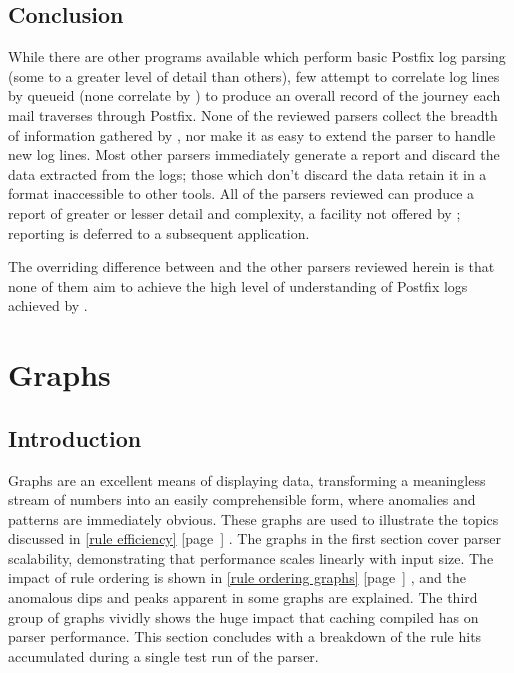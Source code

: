 \documentclass[a4paper,12pt,draft]{article}
\newcommand{\parsername}{\PLP{}}
\newcommand{\refwithpage}[1]{%
    \empty{}\ref{#1} [page~\pageref{#1}]%
}
\newcommand{\sectionref}[1]{%
    \textsection{}\refwithpage{#1}%
}
\begin{document}
\subsection{Conclusion}

While there are other programs available which perform basic Postfix log
parsing (some to a greater level of detail than others), few attempt to
correlate log lines by queueid (none correlate by \pid{}) to produce an
overall record of the journey each mail traverses through Postfix.  None of
the reviewed parsers collect the breadth of information gathered by
\parsername{}, nor make it as easy to extend the parser to handle new log
lines.  Most other parsers immediately generate a report and discard the
data extracted from the logs; those which don't discard the data retain it
in a format inaccessible to other tools.  All of the parsers reviewed can
produce a report of greater or lesser detail and complexity, a facility not
offered by \parsername{}; reporting is deferred to a subsequent
application.

The overriding difference between \parsername{} and the other parsers
reviewed herein is that none of them aim to achieve the high level of
understanding of Postfix logs achieved by \parsername{}.




\label{bibliography}

\section{Graphs}

\label{graphs}

\renewcommand{\figurename}{Graph}

\subsection{Introduction}

Graphs are an excellent means of displaying data, transforming a
meaningless stream of numbers into an easily comprehensible form, where
anomalies and patterns are immediately obvious.  These graphs are used to
illustrate the topics discussed in \sectionref{rule efficiency}.  The
graphs in the first section cover parser scalability, demonstrating that
performance scales linearly with input size.  The impact of rule ordering
is shown in \sectionref{rule ordering graphs}, and the anomalous dips and
peaks apparent in some graphs are explained.  The third group of graphs
vividly shows the huge impact that caching compiled \regexes{} has on
parser performance.  This section concludes with a breakdown of the rule
hits accumulated during a single test run of the parser.
\end{document}
